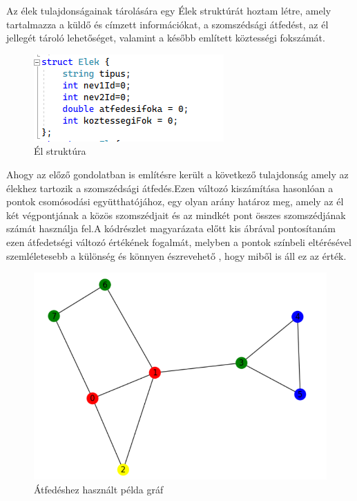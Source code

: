 Az élek tulajdonságainak tárolására egy Élek struktúrát hoztam létre, amely tartalmazza a küldő és címzett információkat, a szomszédsági átfedést, az él jellegét tároló lehetőséget, valamint a később említett köztességi fokszámát.


\begin{figure}[h]
    \centering
    \includegraphics[scale=1.1]{images/elek}
    \caption{Él struktúra}
    \label{fig:enter-label}
\end{figure}

Ahogy az előző gondolatban is említésre került a következő tulajdonság amely az élekhez tartozik  a szomszédsági átfedés.Ezen változó kiszámítása hasonlóan a pontok csomósodási együtthatójához, egy olyan arány határoz meg, amely az él két végpontjának a közös szomszédjait és az mindkét pont összes szomszédjának számát használja fel.A kódrészlet magyarázata előtt kis ábrával pontosítanám ezen átfedetségi változó értékének fogalmát, melyben a pontok színbeli eltérésével szemléletesebb a különség és könnyen észrevehető , hogy miből is áll ez az érték.
\newpage

\begin{figure}[h]
    \centering
    \includegraphics[scale=0.4]{images/atfedesi}
    \caption{Átfedéshez használt példa gráf}
    \label{fig:enter-label}
\end{figure}

